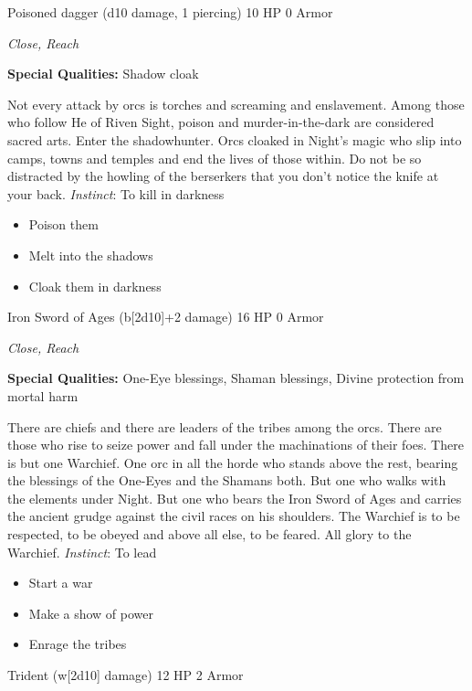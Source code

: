 Poisoned dagger (d10 damage, 1 piercing)\hspace*{\fill} 10 HP 0 Armor

\emph{Close, Reach}

\textbf{Special Qualities:}
Shadow cloak

\HRule
Not every attack by orcs is torches and screaming and enslavement. Among those who follow He of Riven Sight, poison and murder-in-the-dark are considered sacred arts. Enter the shadowhunter. Orcs cloaked in Night's magic who slip into camps, towns and temples and end the lives of those within. Do not be so distracted by the howling of the berserkers that you don't notice the knife at your back. \emph{Instinct}: To kill in darkness
\begin{itemize}
\item Poison them
\item Melt into the shadows
\item Cloak them in darkness
\end{itemize}
\newpage
\HRule
{}

Iron Sword of Ages (b[2d10]+2 damage)\hspace*{\fill} 16 HP 0 Armor

\emph{Close, Reach}

\textbf{Special Qualities:}
One-Eye blessings, Shaman blessings, Divine protection from mortal harm

\HRule
There are chiefs and there are leaders of the tribes among the orcs. There are those who rise to seize power and fall under the machinations of their foes. There is but one Warchief. One orc in all the horde who stands above the rest, bearing the blessings of the One-Eyes and the Shamans both. But one who walks with the elements under Night. But one who bears the Iron Sword of Ages and carries the ancient grudge against the civil races on his shoulders. The Warchief is to be respected, to be obeyed and above all else, to be feared. All glory to the Warchief. \emph{Instinct}: To lead
\begin{itemize}
\item Start a war
\item Make a show of power
\item Enrage the tribes
\end{itemize}

\HRule
{}

Trident (w[2d10] damage)\hspace*{\fill} 12 HP 2 Armor

